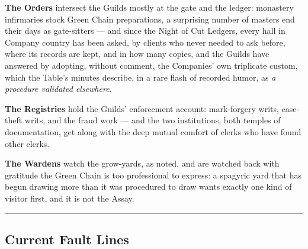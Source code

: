 \textbf{The Orders} intersect the Guilds mostly at the gate and the ledger: monastery infirmaries stock Green Chain preparations, a surprising number of masters end their days as gate-sitters --- and since the Night of Cut Ledgers, every hall in Company country has been asked, by clients who never needed to ask before, where its records are kept, and in how many copies, and the Guilds have answered by adopting, without comment, the Companies' own triplicate custom, which the Table's minutes describe, in a rare flash of recorded humor, as \textit{a procedure validated elsewhere}.

\textbf{The Registries} hold the Guilds' enforcement account: mark-forgery writs, case-theft writs, and the fraud work --- and the two institutions, both temples of documentation, get along with the deep mutual comfort of clerks who have found other clerks.

\textbf{The Wardens} watch the grow-yards, as noted, and are watched back with gratitude the Green Chain is too professional to express: a spagyric yard that has begun drawing more than it was procedured to draw wants exactly one kind of visitor first, and it is not the Assay.

\medskip\hrule\medskip

\subsection{Current Fault Lines}

